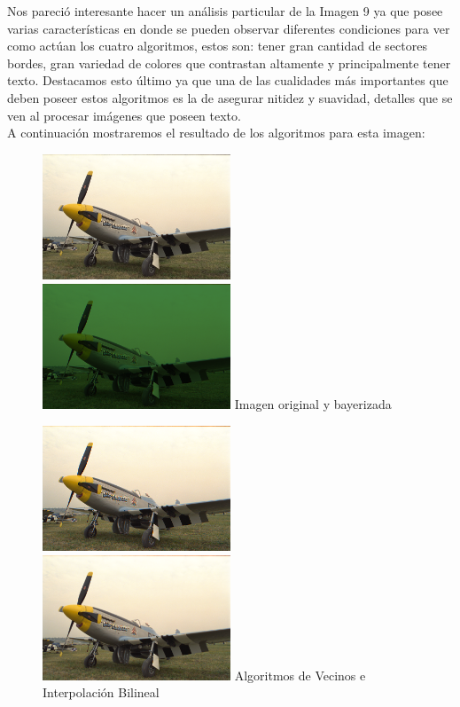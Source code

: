{Nos pareció interesante hacer un análisis particular de la Imagen 9 ya que posee varias características en donde se pueden observar diferentes condiciones para ver como actúan los cuatro algoritmos, estos son: tener gran cantidad de sectores bordes, gran variedad de colores que contrastan altamente y principalmente tener texto. Destacamos esto último ya que una de las cualidades más importantes que deben poseer estos algoritmos es la de asegurar nitidez y suavidad, detalles que se ven al procesar imágenes que poseen texto. \\
A continuación mostraremos el resultado de los algoritmos para esta imagen:

\begin{figure}[h]
       \includegraphics[width=0.5\textwidth]{imagenes/img9.png}
           \hfill
        \includegraphics[width=0.5\textwidth]{imagenes/img9_bayer.png}   
        Imagen original y bayerizada
\end{figure}

\begin{figure}[h]
       \includegraphics[width=0.5\textwidth]{imagenes/img9_demosicing_vecino.png}
           \hfill
        \includegraphics[width=0.5\textwidth]{imagenes/img9_demosicing_bilineal.png}
        Algoritmos de Vecinos e Interpolación Bilineal
\end{figure}


}
